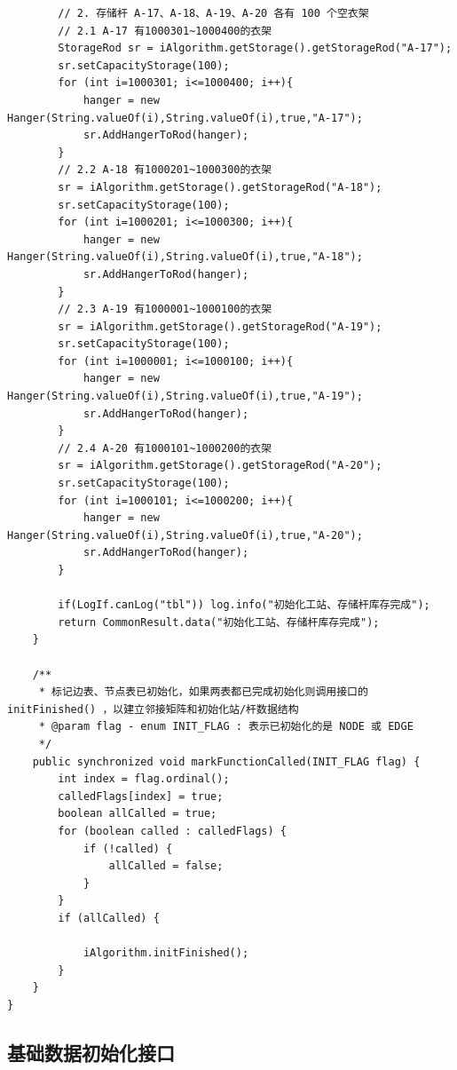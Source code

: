 \begin{lstlisting}
        // 2. 存储杆 A-17、A-18、A-19、A-20 各有 100 个空衣架
        // 2.1 A-17 有1000301~1000400的衣架
        StorageRod sr = iAlgorithm.getStorage().getStorageRod("A-17");
        sr.setCapacityStorage(100);
        for (int i=1000301; i<=1000400; i++){
            hanger = new Hanger(String.valueOf(i),String.valueOf(i),true,"A-17");
            sr.AddHangerToRod(hanger);
        }
        // 2.2 A-18 有1000201~1000300的衣架
        sr = iAlgorithm.getStorage().getStorageRod("A-18");
        sr.setCapacityStorage(100);
        for (int i=1000201; i<=1000300; i++){
            hanger = new Hanger(String.valueOf(i),String.valueOf(i),true,"A-18");
            sr.AddHangerToRod(hanger);
        }
        // 2.3 A-19 有1000001~1000100的衣架
        sr = iAlgorithm.getStorage().getStorageRod("A-19");
        sr.setCapacityStorage(100);
        for (int i=1000001; i<=1000100; i++){
            hanger = new Hanger(String.valueOf(i),String.valueOf(i),true,"A-19");
            sr.AddHangerToRod(hanger);
        }
        // 2.4 A-20 有1000101~1000200的衣架
        sr = iAlgorithm.getStorage().getStorageRod("A-20");
        sr.setCapacityStorage(100);
        for (int i=1000101; i<=1000200; i++){
            hanger = new Hanger(String.valueOf(i),String.valueOf(i),true,"A-20");
            sr.AddHangerToRod(hanger);
        }

        if(LogIf.canLog("tbl")) log.info("初始化工站、存储杆库存完成");
        return CommonResult.data("初始化工站、存储杆库存完成");
    }

    /**
     * 标记边表、节点表已初始化，如果两表都已完成初始化则调用接口的 initFinished() ，以建立邻接矩阵和初始化站/杆数据结构
     * @param flag - enum INIT_FLAG : 表示已初始化的是 NODE 或 EDGE
     */
    public synchronized void markFunctionCalled(INIT_FLAG flag) {
        int index = flag.ordinal();
        calledFlags[index] = true;
        boolean allCalled = true;
        for (boolean called : calledFlags) {
            if (!called) {
                allCalled = false;
            }
        }
        if (allCalled) {

            iAlgorithm.initFinished();
        }
    }
}
\end{lstlisting}\vspace{-30pt}

\subsection{基础数据初始化接口}
